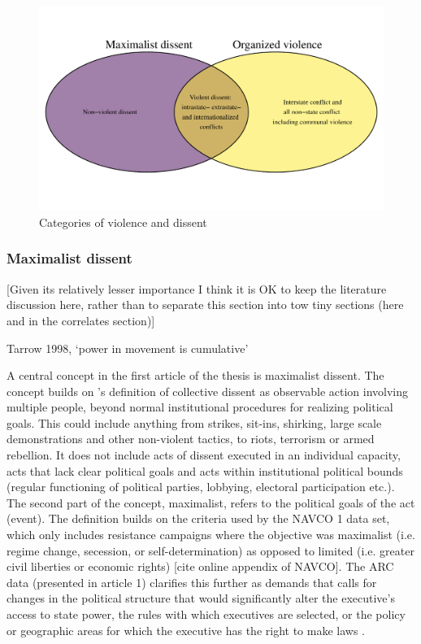 \begin{figure}[htpb]
	\centering
	\includegraphics[width=\textwidth]{../R/Output/venn.pdf}
	\caption{Categories of violence and dissent}
	\label{venn}
\end{figure}

\subsubsection{Maximalist dissent} \label{Maximalist dissent}

[Given its relatively lesser importance I think it is OK to keep the literature
discussion here, rather than to separate this section into tow tiny sections
(here and in the correlates section)]

Tarrow 1998, `power in movement is cumulative'

A central concept in the first article of the thesis is maximalist dissent. The
concept builds on \citet{TillyCharles1978Fmtr}'s definition of collective
dissent as observable action involving multiple people, beyond normal
institutional procedures for realizing political goals. This could include
anything from strikes, sit-ins, shirking, large scale demonstrations and other
non-violent tactics, to riots, terrorism or armed rebellion. It does not include
acts of dissent executed in an individual capacity, acts that lack clear
political goals and acts within institutional political bounds (regular
functioning of political parties, lobbying, electoral participation etc.). The
second part of the concept, maximalist, refers to the political goals of the act
(event). The definition builds on the criteria used by the NAVCO 1 data set,
which only includes resistance campaigns where the objective was maximalist
(i.e. regime change, secession, or self-determination) as opposed to limited
(i.e. greater civil liberties or economic rights) [cite online appendix of
NAVCO]. The ARC data (presented in article 1) clarifies this further as demands
that calls for changes in the political structure that would significantly alter
the executive’s access to state power, the rules with which executives are
selected, or the policy or geographic areas for which the executive has the
right to make laws \citep{Butcher_2022}.

